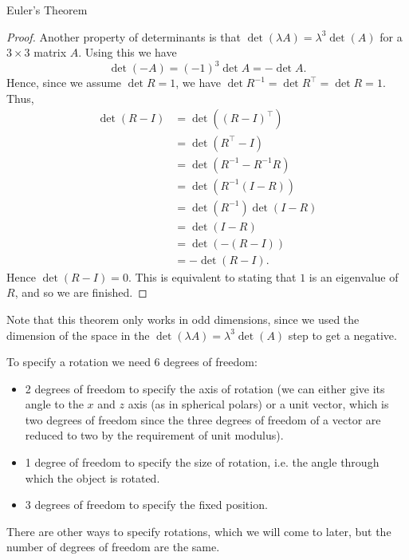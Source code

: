 \documentclass[fleqn]{NotesClass}
\newcommand*{\ident}{I}
\newcommand*{\trans}{\top}
\begin{document}
\begin{thm}{Euler's Theorem}{}
\begin{proof}
            Another property of determinants is that \(\det(\lambda A) = \lambda^3\det(A)\) for a \(3\times 3\) matrix \(A\).
            Using this we have
            \begin{equation}
                \det(-A) = (-1)^3\det A = -\det A.
            \end{equation}
            Hence, since we assume \(\det R = 1\), we have \(\det R^{-1} = \det R^\trans = \det R = 1\).
            Thus,
            \begin{align}
                \det(R - \ident) &= \det((R - \ident)^{\trans})\\
                &= \det(R^\trans - \ident)\\
                &= \det(R^{-1} - R^{-1}R)\\
                &= \det(R^{-1}(\ident - R))\\
                &= \det(R^{-1})\det(\ident - R)\\
                &= \det(\ident - R)\\
                &= \det(-(R - \ident))\\
                &= -\det(R - \ident).
            \end{align}
            Hence \(\det(R - \ident) = 0\).
            This is equivalent to stating that \(1\) is an eigenvalue of \(R\), and so we are finished.
        \end{proof}
    \end{thm}
    Note that this theorem only works in odd dimensions, since we used the dimension of the space in the \(\det(\lambda A) = \lambda^3\det(A)\) step to get a negative.
    
    To specify a rotation we need 6 degrees of freedom:
    \begin{itemize}
        \item 2 degrees of freedom to specify the axis of rotation (we can either give its angle to the \(x\) and \(z\) axis (as in spherical polars) or a unit vector, which is two degrees of freedom since the three degrees of freedom of a vector are reduced to two by the requirement of unit modulus).
        \item 1 degree of freedom to specify the size of rotation, i.e. the angle through which the object is rotated.
        \item 3 degrees of freedom to specify the fixed position.
    \end{itemize}
    There are other ways to specify rotations, which we will come to later, but the number of degrees of freedom are the same.
    
\end{document}

